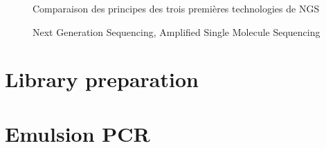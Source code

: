 \documentclass[a4paper]{article}
\begin{document}
\begin{figure}[!h]
\caption{Comparaison des principes des trois premières technologies de NGS}
\end{figure}


\begin{figure}[!h]
\caption{Next Generation Sequencing, Amplified Single Molecule Sequencing}
\end{figure}

\section{Library preparation}

\section{Emulsion PCR}
\end{document}
